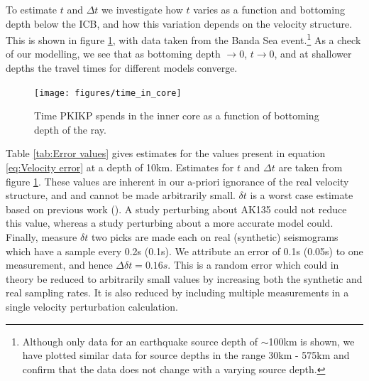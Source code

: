 \documentclass[11pt,a4paper]{article}
\begin{document}
To estimate $t$ and $\Delta t$ we investigate how $t$ varies as a function and bottoming depth below the ICB, and how this variation depends on the velocity structure. This is shown in figure \ref{fig:Time in core}, with data taken from the Banda Sea event.\footnote{Although only data for an earthquake source depth of $\sim$100km is shown, we have plotted similar data for source depths in the range 30km - 575km and confirm that the data does not change with a varying source depth.} As a check of our modelling, we see that as bottoming depth $\rightarrow 0$, $t \rightarrow 0$, and at shallower depths the travel times for different models converge.

\begin{figure}
	\centering
	\texttt{[image: figures/time\_in\_core]}
	\caption{Time PKIKP spends in the inner core as a function of bottoming depth of the ray.}
	\label{fig:Time in core}
\end{figure}

Table \ref{tab:Error values} gives estimates for the values present in equation \eqref{eq:Velocity error} at a depth of 10km. Estimates for $t$ and $\Delta t$ are taken from figure \ref{fig:Time in core}. These values are inherent in our a-priori ignorance of the real velocity structure, and and cannot be made arbitrarily small. $\delta t$ is a worst case estimate based on previous work (\cite{Waszek2011a}). A study perturbing about AK135 could not reduce this value, whereas a study perturbing about a more accurate model could. Finally, measure $\delta t$ two picks are made each on real (synthetic) seismograms which have a sample every 0.2s (0.1s). We attribute an error of 0.1s (0.05s) to one measurement, and hence $\Delta \delta t = 0.16s$. This is a random error which could in theory be reduced to arbitrarily small values by increasing both the synthetic and real sampling rates. It is also reduced by including multiple measurements in a single velocity perturbation calculation.
\end{document}
